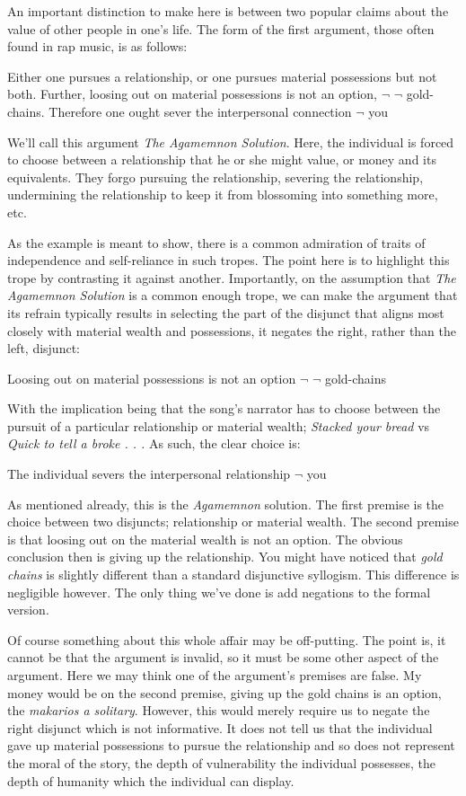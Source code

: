 \documentclass[phdthesis,12pt,final]{wuthesis}
\theoremstyle{definition}
\theoremstyle{definition}
\theoremstyle{definition}
\theoremstyle{definition}
\theoremstyle{remark}
\begin{document}
An important distinction to make here is between two popular claims about the value of other people in one's life. The form of the first argument, those often found in rap music, is as follows:

Either one pursues a relationship, or one pursues material possessions but not both. Further, loosing out on material possessions is not an option, \(\lnot\) \(\lnot\) gold-chains. Therefore one ought sever the interpersonal connection \(\lnot\) you

We'll call this argument \emph{The Agamemnon Solution}. Here, the individual is forced to choose between a relationship that he or she might value, or money and its equivalents. They forgo pursuing the relationship, severing the relationship, undermining the relationship to keep it from blossoming into something more, etc.

As the example is meant to show, there is a common admiration of traits of independence and self-reliance in such tropes. The point here is to highlight this trope by contrasting it against another. Importantly, on the assumption that \emph{The Agamemnon Solution} is a common enough trope, we can make the argument that its refrain typically results in selecting the part of the disjunct that aligns most closely with material wealth and possessions, it negates the right, rather than the left, disjunct:

Loosing out on material possessions is not an option \(\lnot\) \(\lnot\) gold-chains

With the implication being that the song's narrator has to choose between the pursuit of a particular relationship or material wealth; \emph{Stacked your bread} vs \emph{Quick to tell a broke . . .} As such, the clear choice is:

The individual severs the interpersonal relationship \(\lnot\) you

As mentioned already, this is the \emph{Agamemnon} solution. The first premise is the choice between two disjuncts; relationship or material wealth. The second premise is that loosing out on the material wealth is not an option. The obvious conclusion then is giving up the relationship. You might have noticed that \emph{gold chains} is slightly different than a standard disjunctive syllogism. This difference is negligible however. The only thing we've done is add negations to the formal version.

Of course something about this whole affair may be off-putting. The point is, it cannot be that the argument is invalid, so it must be some other aspect of the argument. Here we may think one of the argument's premises are false. My money would be on the second premise, giving up the gold chains is an option, the \emph{makarios a solitary}. However, this would merely require us to negate the right disjunct which is not informative. It does not tell us that the individual gave up material possessions to pursue the relationship and so does not represent the moral of the story, the depth of vulnerability the individual possesses, the depth of humanity which the individual can display.
\end{document}
